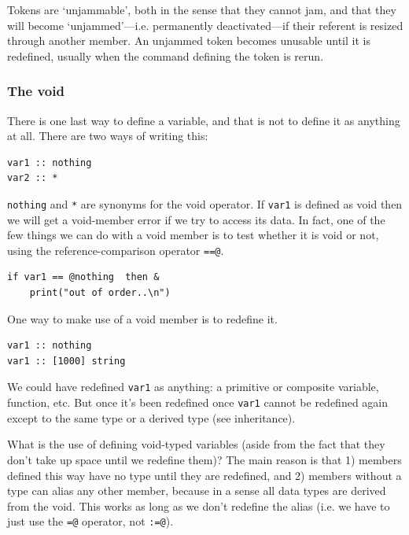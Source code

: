 \documentclass{article}
\newenvironment{code}{
       \begin{list}{}{
               \setlength{\leftmargin}{.4in}
               \setlength{\rightmargin}{0in}
               \setlength{\topsep}{.2in}
       }
       \small
       \item[] }
       { \end{list}   }
\begin{document}
\noindent Tokens are `unjammable', both in the sense that they cannot jam, and that they will become `unjammed'---i.e. permanently deactivated---if their referent is resized through another member.  An unjammed token becomes unusable until it is redefined, usually when the command defining the token is rerun.





\subsubsection{The void}

There is one last way to define a variable, and that is not to define it as anything at all.  There are two ways of writing this:

\begin{code} \begin{verbatim}
var1 :: nothing
var2 :: *
\end{verbatim} \end{code}

\noindent \verb#nothing# and \verb#*# are synonyms for the void operator.  If \verb#var1# is defined as void then we will get a void-member error if we try to access its data.  In fact, one of the few things we can do with a void member is to test whether it is void or not, using the reference-comparison operator \verb#==@#.

\begin{code} \begin{verbatim}
if var1 == @nothing  then &
    print("out of order..\n")
\end{verbatim} \end{code}

One way to make use of a void member is to redefine it.

\begin{code} \begin{verbatim}
var1 :: nothing
var1 :: [1000] string
\end{verbatim} \end{code}

\noindent We could have redefined \verb#var1# as anything:  a primitive or composite variable, function, etc.  But once it's been redefined once \verb#var1# cannot be redefined again except to the same type or a derived type (see inheritance).

What is the use of defining void-typed variables (aside from the fact that they don't take up space until we redefine them)?  The main reason is that 1) members defined this way have no type until they are redefined, and 2) members without a type can alias any other member, because in a sense all data types are derived from the void.  This works as long as we don't redefine the alias (i.e. we have to just use the \verb#=@# operator, not \verb#:=@#).
\end{document}
